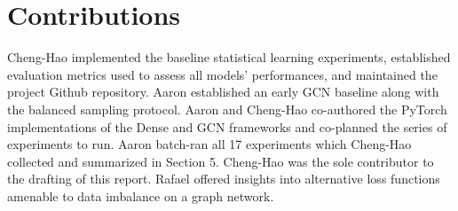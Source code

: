 \documentclass{article}
\begin{document}
\section{Contributions}
Cheng-Hao implemented the baseline statistical learning experiments, established evaluation metrics used to assess all models' performances, and maintained the project Github repository. Aaron established an early GCN baseline along with the balanced sampling protocol. Aaron and Cheng-Hao co-authored the PyTorch implementations of the Dense and GCN frameworks and co-planned the series of experiments to run. Aaron batch-ran all 17 experiments which Cheng-Hao collected and summarized in Section 5. Cheng-Hao was the sole contributor to the drafting of this report. Rafael offered insights into alternative loss functions amenable to data imbalance on a graph network.



\end{document}
